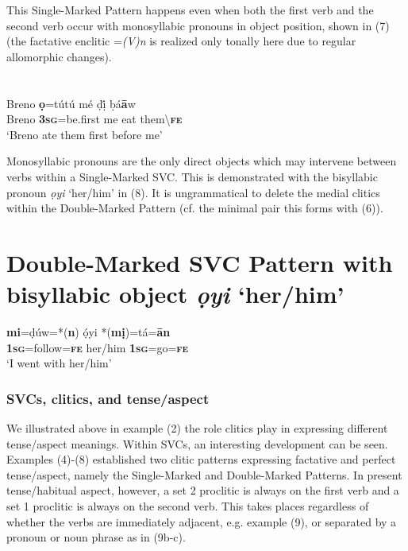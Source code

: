 \begin{styleNoSpacing}
This Single-Marked Pattern happens even when both the first verb and the second verb occur with monosyllabic pronouns in object position, shown in (7) (the factative enclitic =\textit{(V)n} is realized only tonally here due to regular allomorphic changes).
\end{styleNoSpacing}

\chapter[]{}
\label{bkm:Ref448080695}\gll Breno   \textbf{ọ}=tútú     mé   ḍị́   ḅá\textbf{\={a}}w\\
     Breno  \textbf{\textsc{3sg}}=be.first  me  eat  them{\textbackslash}\textbf{\textsc{fe}}\\
\glt ‘Breno ate them first before me’
\z

Monosyllabic pronouns are the only direct objects which may intervene between verbs within a Single-Marked SVC. This is demonstrated with the bisyllabic pronoun \textit{ọyi} ‘her/him’ in (8). It is ungrammatical to delete the medial clitics within the Double-Marked Pattern (cf. the minimal pair this forms with (6)). 

\chapter[Double{}-Marked SVC Pattern with bisyllabic object ọyi ‘her/him’]{Double-Marked SVC Pattern with bisyllabic object \textit{ọyi} ‘her/him’}
\label{bkm:Ref419898704}\gll \textbf{mi}=ḍúw=*(\textbf{n})     ọ́yi     *(\textbf{mị})=tá=\textbf{\={a}n}\\
     \textbf{1}\textbf{\textsc{sg}}=follow=\textbf{\textsc{fe}}   her/him   \textbf{1}\textbf{\textsc{sg}}=go=\textbf{\textsc{fe}}\\
\glt ‘I went with her/him’ \citep[201]{Kari2004}
\z

\subsection{\rmfamily SVCs, clitics, and tense/aspect}

We illustrated above in example (2) the role clitics play in expressing different tense/aspect meanings. Within SVCs, an interesting development can be seen. Examples (4){}-(8) established two clitic patterns expressing factative and perfect tense/aspect, namely the Single-Marked and Double-Marked Patterns. In present tense/habitual aspect, however, a set 2 proclitic is always on the first verb and a set 1\textit{ }proclitic is always on the second verb. This takes places regardless of whether the verbs are immediately adjacent, e.g. example (9), or separated by a pronoun or noun phrase as in (9b-c). 

